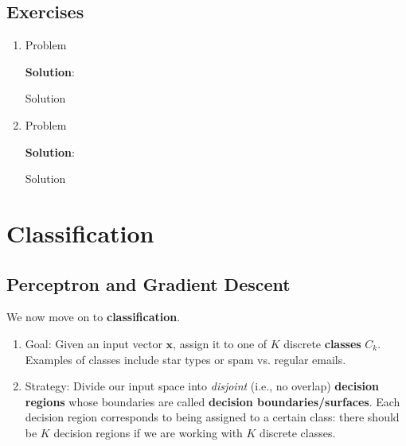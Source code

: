 \documentclass[11pt, letterpaper]{article}
\theoremstyle{definition}
\theoremstyle{plain}
\newenvironment{solution}{
    \vspace{2mm}
    \color{blue}\noindent\textbf{Solution}:
}{}
\begin{document}
\subsection{Exercises}

\begin{mdframed}
    \begin{enumerate}
        \item Problem
        
        \begin{solution}
            Solution
        \end{solution}

        \item Problem
        
        \begin{solution}
            Solution
        \end{solution}
    \end{enumerate}
\end{mdframed}

\section{Classification}
\subsection{Perceptron and Gradient Descent}

 We now move on to \textbf{classification}.
\begin{enumerate}
    \item Goal: Given an input vector $\bm x$, assign it to one of $K$ discrete \textbf{classes} $C_k$. Examples of classes include star types or spam vs. regular emails.
    \item Strategy: Divide our input space into \emph{disjoint} (i.e., no overlap) \textbf{decision regions} whose boundaries are called \textbf{decision boundaries/surfaces}. Each decision region corresponds to being assigned to a certain class: there should be $K$ decision regions if we are working with $K$ discrete classes.
\end{enumerate}
\end{document}
